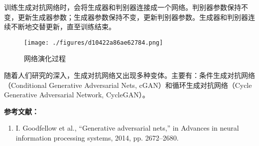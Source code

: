 训练生成对抗网络时，会将生成器和判别器连接成一个网络。判别器参数保持不变，更新生成器参数；生成器参数保持不变，更新判别器参数。生成器和判别器连续不断地交替更新，直至训练结束。
\begin{figure}[ht]
\centering
\texttt{[image: ./figures/d10422a86ae62784.png]}
\caption{网络演化过程} \label{fig_GAN_1}
\end{figure}

随着人们研究的深入，生成对抗网络又出现多种变体。主要有：条件生成对抗网络（Conditional Generative Adversarial Nets, cGAN）和循环生成对抗网络（Cycle Generative Adversarial Network, CycleGAN）。




\textbf{参考文献：}
\begin{enumerate}
\item I. Goodfellow et al., “Generative adversarial nets,” in Advances in neural information processing systems, 2014, pp. 2672–2680.
\end{enumerate}

